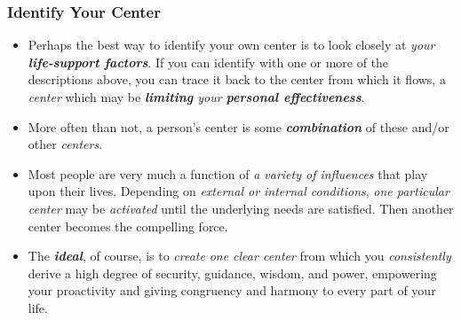 \documentclass[11pt]{article}
\begin{document}
\subsubsection{Identify Your Center}
\begin{itemize}
\item Perhaps the best way to identify your own center is to look closely at \emph{your \textbf{life-support factors}}. If you can identify with one or more of the descriptions above, you can trace it back to the center from which it flows, a \emph{center} which may be \emph{\textbf{limiting} your \textbf{personal effectiveness}}.

\item More often than not, a person's center is some \emph{\textbf{combination}} of these and/or other \emph{centers}. 

\item Most people are very much a function of \emph{a variety of influences} that play upon their lives. Depending on
\emph{external or internal conditions}, \emph{one particular center} may be \emph{activated} until the underlying needs are satisfied. Then another center becomes the compelling force.

\item The \emph{\textbf{ideal}}, of course, is to \emph{create} \emph{one clear center} from which you \emph{consistently} derive a high degree of security, guidance, wisdom, and power, empowering your proactivity and giving congruency and harmony to every part of your life.
\end{itemize}
\end{document}
